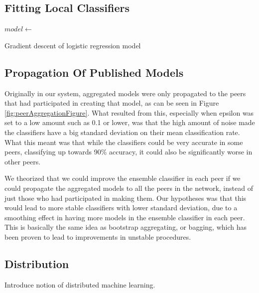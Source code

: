 
\subsection{Fitting Local Classifiers}

\begin{algorithm}[H]
	$model \leftarrow 	$
	\caption{Gradient descent of logistic regression model}
\end{algorithm}

\subsection{Propagation Of Published Models}

Originally in our system, aggregated models were only propagated to the peers that had participated in creating that model, as can be seen in Figure \ref{fig:peerAggregationFigure}. What resulted from this, especially when epsilon was set to a low amount such as 0.1 or lower, was that the high amount of noise made the classifiers have a big standard deviation on their mean classification rate. What this meant was that while the classifiers could be very accurate in some peers, classifying up towards 90\% accuracy, it could also be significantly worse in other peers. 

We theorized that we could improve the ensemble classifier in each peer if we could propagate the aggregated models to all the peers in the network, instead of just those who had participated in making them. Our hypotheses was that this would lead to more stable classifiers with lower standard deviation, due to a smoothing effect in having more models in the ensemble classifier in each peer. This is basically the same idea as bootstrap aggregating, or bagging, which has been proven to lead to improvements in unstable procedures\cite{breiman1996bagging}. 



\subsection{Distribution}
Introduce notion of distributed machine learning. 

